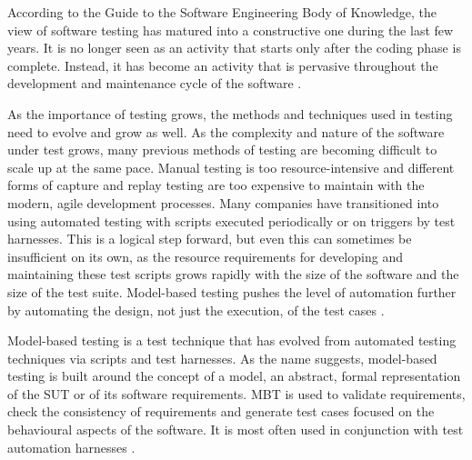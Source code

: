 According to the Guide to the Software Engineering Body of Knowledge, the view of software testing has matured into a constructive one during the last few years. It is no longer seen as an activity that starts only after the coding phase is complete. Instead, it has become an activity that is pervasive throughout the development and maintenance cycle of the software \cite{swebok}. 

As the importance of testing grows, the methods and techniques used in testing need to evolve and grow as well. As the complexity and nature of the software under test grows, many previous methods of testing are becoming difficult to scale up at the same pace. Manual testing is too resource-intensive and different forms of capture and replay testing are too expensive to maintain with the modern, agile development processes. Many companies have transitioned into using automated testing with scripts executed periodically or on triggers by test harnesses. This is a logical step forward, but even this can sometimes be insufficient on its own, as the resource requirements for developing and maintaining these test scripts grows rapidly with the size of the software and the size of the test suite. Model-based testing pushes the level of automation further by automating the design, not just the execution, of the test cases \cite{tools}. 

Model-based testing is a test technique that has evolved from automated testing techniques via scripts and test harnesses. As the name suggests, model-based testing is built around the concept of a model, an abstract, formal representation of the SUT or of its software requirements. MBT is used to validate requirements, check the consistency of requirements and generate test cases focused on the behavioural aspects of the software. It is most often used in conjunction with test automation harnesses \cite{swebok}.

